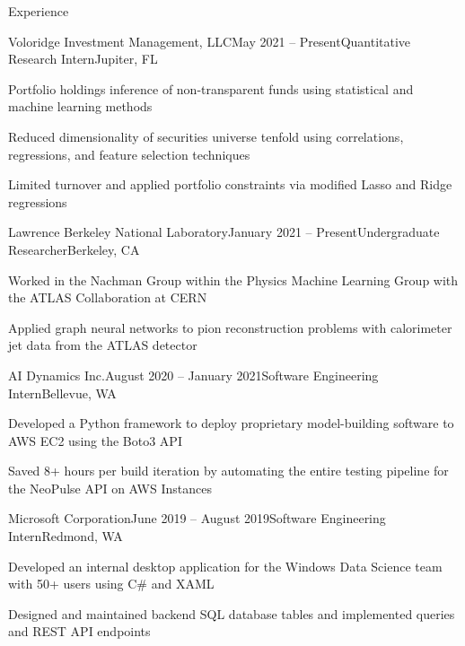 \documentclass{resume} %
\begin{document}
\begin{rSection}{Experience}

\begin{rSubsection}{Voloridge Investment Management, LLC}{May 2021 – Present}{Quantitative Research Intern}{Jupiter, FL}
    \item Portfolio holdings inference of non-transparent funds using statistical and machine learning methods
    \item Reduced dimensionality of securities universe tenfold using correlations, regressions, and feature selection techniques
    \item Limited turnover and applied portfolio constraints via modified Lasso and Ridge regressions
\end{rSubsection}

\begin{rSubsection}{Lawrence Berkeley National Laboratory}{January 2021 – Present}{Undergraduate Researcher}{Berkeley, CA}
    \item Worked in the Nachman Group within the Physics Machine Learning Group with the ATLAS Collaboration at CERN
    \item Applied graph neural networks to pion reconstruction problems with calorimeter jet data from the ATLAS detector
\end{rSubsection}

\begin{rSubsection}{AI Dynamics Inc.}{August 2020 – January 2021}{Software Engineering Intern}{Bellevue, WA}
    \item Developed a Python framework to deploy proprietary model-building software to AWS EC2 using the Boto3 API
    \item Saved 8+ hours per build iteration by automating the entire testing pipeline for the NeoPulse API on AWS Instances
\end{rSubsection}

\begin{rSubsection}{Microsoft Corporation}{June 2019 – August 2019}{Software Engineering Intern}{Redmond, WA}
    \item Developed an internal desktop application for the Windows Data Science team with 50+ users using C\# and XAML
    \item Designed and maintained backend SQL database tables and implemented queries and REST API endpoints
\end{rSubsection}


\end{rSection}
\end{document}
